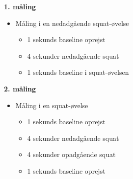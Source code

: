 \textbf{1. måling}
\begin{itemize}
\item Måling i en nedadgående squat-øvelse
	\begin{itemize}
	\item 1 sekunds baseline oprejst
	\item 4 sekunder nedadgående squat 
	\item 1 sekunds baseline i squat-øvelsen
	\end{itemize}
\end{itemize}
	
\textbf{2. måling}
\begin{itemize}
\item Måling i en squat-øvelse
	\begin{itemize}
	\item 1 sekunds baseline oprejst
	\item 4 sekunder nedadgående squat 
	\item 4 sekunder opadgående squat
	\item 1 sekunds baseline oprejst
	\end{itemize}
\end{itemize}


